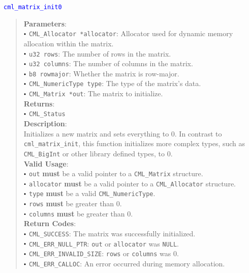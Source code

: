 \documentclass[a4paper,oneside,8pt]{extarticle}
\newcommand{\function}[1]{
  \noindent\textcolor{blue}{\texttt{#1}}
  \vspace{-0.3em}
}
\renewcommand{\dot}{\raisebox{0.3ex}{\scalebox{0.6}{$\bullet$}}}
\theoremstyle{definition}
\begin{document}
\function{cml\_matrix\_init0}
\begin{quote}
  \textbf{Parameters}: \\
  $\dot$ \texttt{CML\_Allocator *allocator}: Allocator used for dynamic memory allocation within the matrix. \\
  $\dot$ \texttt{u32 rows}: The number of rows in the matrix. \\
  $\dot$ \texttt{u32 columns}: The number of columns in the matrix. \\
  $\dot$ \texttt{b8 rowmajor}: Whether the matrix is row-major. \\
  $\dot$ \texttt{CML\_NumericType type}: The type of the matrix's data. \\
  $\dot$ \texttt{CML\_Matrix *out}: The matrix to initialize. \\
  \textbf{Returns}: \\
  $\dot$ \texttt{CML\_Status} \\
  
  \vspace{-0.75em}
  \textbf{Description}: \\
  Initializes a new matrix and sets everything to 0. In contrast to \texttt{cml\_matrix\_init}, this function initializes more complex types, such as \texttt{CML\_BigInt} or other library defined types, to 0. \\

  \vspace{-0.75em}
  \textbf{Valid Usage}: \\
  $\dot$ \texttt{out} \textbf{must} be a valid pointer to a \texttt{CML\_Matrix} structure. \\
  $\dot$ \texttt{allocator} \textbf{must} be a valid pointer to a \texttt{CML\_Allocator} structure. \\
  $\dot$ \texttt{type} \textbf{must} be a valid \texttt{CML\_NumericType}. \\
  $\dot$ \texttt{rows} \textbf{must} be greater than 0. \\
  $\dot$ \texttt{columns} \textbf{must} be greater than 0. \\

  \vspace{-0.75em}
  \textbf{Return Codes}: \\
  $\dot$ \texttt{CML\_SUCCESS}: The matrix was successfully initialized. \\
  $\dot$ \texttt{CML\_ERR\_NULL\_PTR}: \texttt{out} or \texttt{allocator} was \texttt{NULL}. \\
  $\dot$ \texttt{CML\_ERR\_INVALID\_SIZE}: \texttt{rows} or \texttt{columns} was 0. \\
  $\dot$ \texttt{CML\_ERR\_CALLOC}: An error occurred during memory allocation. \\
\end{quote}
\end{document}
